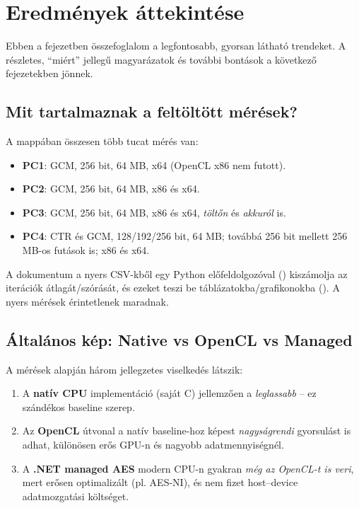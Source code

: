 \chapter{Eredmények áttekintése}

Ebben a fejezetben összefoglalom a legfontosabb, gyorsan látható trendeket.
A részletes, ``miért'' jellegű magyarázatok és további bontások a következő fejezetekben jönnek.

\section{Mit tartalmaznak a feltöltött mérések?}

A  mappában összesen több tucat mérés van:

\begin{itemize}
  \item \textbf{PC1}: GCM, 256 bit, 64 MB, x64 (OpenCL x86 nem futott).
  \item \textbf{PC2}: GCM, 256 bit, 64 MB, x86 és x64.
  \item \textbf{PC3}: GCM, 256 bit, 64 MB, x86 és x64, \emph{töltőn} és \emph{akkuról} is.
  \item \textbf{PC4}: CTR és GCM, 128/192/256 bit, 64 MB; továbbá 256 bit mellett 256 MB-os futások is; x86 és x64.
\end{itemize}

A dokumentum a nyers CSV-kből egy Python előfeldolgozóval ()
kiszámolja az iterációk átlagát/szórását, és ezeket teszi be táblázatokba/grafikonokba
(). A nyers mérések érintetlenek maradnak.

\section{Általános kép: Native vs OpenCL vs Managed}

A mérések alapján három jellegzetes viselkedés látszik:

\begin{enumerate}
  \item A \textbf{natív CPU} implementáció (saját C) jellemzően a \emph{leglassabb} -- ez szándékos baseline szerep.
  \item Az \textbf{OpenCL} útvonal a natív baseline-hoz képest \emph{nagyságrendi} gyorsulást is adhat,
        különösen erős GPU-n és nagyobb adatmennyiségnél.
  \item A \textbf{.NET managed AES} modern CPU-n gyakran \emph{még az OpenCL-t is veri}, mert
        erősen optimalizált (pl. AES-NI), és nem fizet host--device adatmozgatási költséget.
\end{enumerate}

